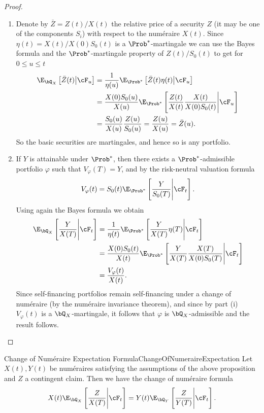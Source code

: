 \begin{proof}
	\begin{enumerate}[label=(\roman*), leftmargin=*]
		\item Denote by \(\bar{Z} = Z(t)/X(t)\) the relative price of a security \(Z\) (it may be one of the components \(S_i\)) with respect to the num\'{e}raire \(X(t)\). Since \(\eta(t) = X(t)/X(0)S_0(t)\) is a \(\Prob^*\)-martingale we can use the Bayes formula and the \(\Prob^*\)-martingale property of \(Z(t)/S_0(t)\) to get for \(0 \le u \le t\)
		      \begin{align*}
			      \E_{\bQ_X} \left[ \bar{Z}(t) \middle| \cF_u \right]
			       & = \frac{1}{\eta(u)} \E_{\Prob^*} \left[ \bar{Z}(t)\eta(t) \middle| \cF_u \right]                             \\
			       & = \frac{X(0)S_0(u)}{X(u)} \E_{\Prob^*} \left[ \frac{Z(t)}{X(t)} \frac{X(t)}{X(0)S_0(t)} \Bigg| \cF_u \right] \\
			       & = \frac{S_0(u)}{X(u)} \frac{Z(u)}{S_0(u)} = \frac{Z(u)}{X(u)} = \bar{Z}(u).
		      \end{align*}
		      So the basic securities are martingales, and hence so is any portfolio.
		\item If \(Y\) is attainable under \(\Prob^*\), then there exists a \(\Prob^*\)-admissible portfolio \(\varphi\) such that \(V_{\varphi}(T) = Y\), and by the risk-neutral valuation formula
		      \[
			      V_{\varphi}(t) = S_0(t)\E_{\Prob^*} \left[ \frac{Y}{S_0(T)} \Bigg| \cF_t \right].
		      \]
		      Using again the Bayes formula we obtain
		      \begin{align*}
			      \E_{\bQ_X} \left[ \frac{Y}{X(T)} \Bigg| \cF_t \right]
			       & = \frac{1}{\eta(t)} \E_{\Prob^*} \left[ \frac{Y}{X(T)} \eta(T) \Bigg| \cF_t \right]                       \\
			       & = \frac{X(0)S_0(t)}{X(t)} \E_{\Prob^*} \left[ \frac{Y}{X(T)} \frac{X(T)}{X(0)S_0(T)} \Bigg| \cF_t \right] \\
			       & = \frac{V_{\varphi}(t)}{X(t)}.
		      \end{align*}
		      Since self-financing portfolios remain self-financing under a change of num\'{e}raire (by the num\'{e}raire invariance theorem), and since by part (i) \(V_{\varphi}(t)\) is a \(\bQ_X\)-martingale, it follows that \(\varphi\) is \(\bQ_X\)-admissible and the result follows.
	\end{enumerate}
\end{proof}

\begin{cor}{Change of Numéraire Expectation Formula}{ChangeOfNumeraireExpectation}
	Let \(X(t), Y(t)\) be numéraires satisfying the assumptions of the above proposition and \(Z\) a contingent claim. Then we have the change of numéraire formula
	\begin{equation}\label{eq:ChangeOfNumeraireExpectationFormula}
		X(t)\E_{\bQ_X} \left[ \frac{Z}{X(T)} \Bigg| \cF_t \right] = Y(t)\E_{\bQ_Y} \left[ \frac{Z}{Y(T)} \Bigg| \cF_t \right].
	\end{equation}
\end{cor}

